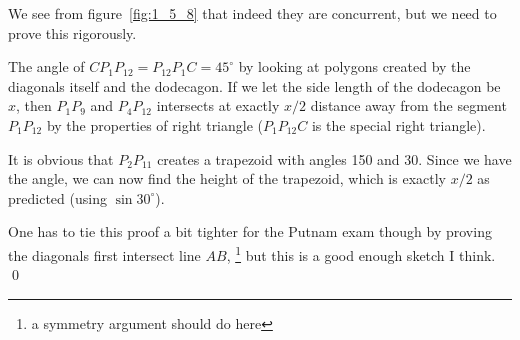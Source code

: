 \begin{Exercise}
	We see from figure~\ref{fig:1_5_8} that indeed they are concurrent, but we need to prove this rigorously.

	The angle of $CP_1P_{12} = P_{12}P_1C = 45^{\circ}$ by looking at polygons created by the diagonals itself and the dodecagon.
	If we let the side length of the dodecagon be $x$, then $P_1P_9$ and $P_4P_{12}$ intersects at exactly $x/2$ distance away from the segment $P_1P_{12}$ by the properties of right triangle ($P_1P_{12}C$ is the special right triangle).

	It is obvious that $P_2P_{11}$ creates a trapezoid with angles 150 and 30. 
	Since we have the angle, we can now find the height of the trapezoid, which is exactly $x/2$ as predicted (using $\sin 30^{\circ}$).

	One has to tie this proof a bit tighter for the Putnam exam though by proving the diagonals first intersect line $AB$,
	\footnote{a symmetry argument should do here} but
	this is a good enough sketch I think. \qed
\end{Exercise}


